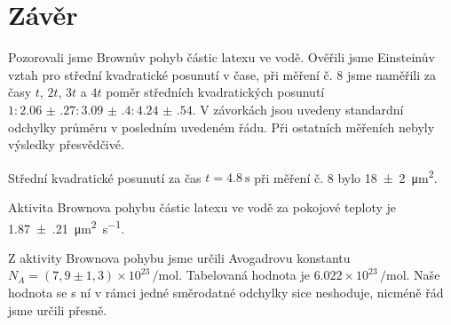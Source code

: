 \section*{Závěr}
Pozorovali jsme Brownův pohyb částic latexu ve vodě.
Ověřili jsme Einsteinův vztah pro střední kvadratické posunutí v čase, při měření č. 8 jsme naměřili za časy $t$, $2t$, $3t$ a $4t$ poměr středních kvadratických posunutí $1:\num[separate-uncertainty=false]{2.06(27)}:\num[separate-uncertainty=false]{3.09(40)}:\num[separate-uncertainty=false]{4.24(54)}$.
V závorkách jsou uvedeny standardní odchylky průměru v posledním uvedeném řádu.
Při ostatních měřeních nebyly výsledky přesvědčivé.

Střední kvadratické posunutí za čas $t=\SI{4.8}{\s}$ při měření č. 8 bylo \SI{18(2)}{\micro\metre\squared}.

Aktivita Brownova pohybu částic latexu ve vodě za pokojové teploty je \SI{1.87(21)}{\micro\metre\squared\per\s}.

Z aktivity Brownova pohybu jsme určili Avogadrovu konstantu $N_A = (7,9 \pm 1,3) \times 10^{23} \,\si{\per\mole}$. 
Tabelovaná hodnota \cite{avogadro} je $\num{6.022}\times 10^{23}\,\si{\per\mole}$. Naše hodnota se s ní v rámci jedné směrodatné odchylky sice neshoduje, nicméně řád jsme určili přesně.